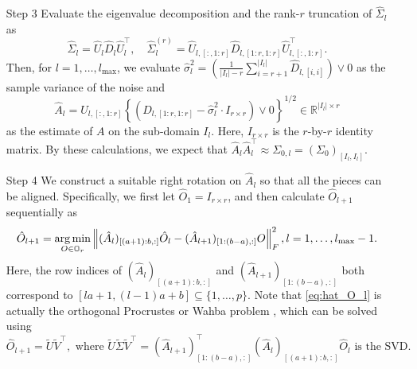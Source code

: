 \documentclass[11pt]{article}
\newcommand{\0}{{\mathbf{0}}}
\newcommand{\1}{{\mathbf{1}}}
\newcommand{\argmin}{\mathop{\rm arg\min}}
\begin{document}
\begin{enumerate}
	\item[Step 3] Evaluate the eigenvalue decomposition and the rank-$r$ truncation of $\hat{\Sigma}_l$ as 
	\begin{equation}
	\hat{\Sigma}_l = \hat{U}_l\hat{D}_l\hat{U}_l^\top,\quad \hat{\Sigma}_l^{(r)} = \hat{U}_{l, [:, 1:r]}\hat{D}_{l, [1:r, 1:r]}\hat{U}_{l, [:, 1:r]}^\top.
	\end{equation}
	Then, for $l=1,\ldots, l_{\max}$, we evaluate $\hat{\sigma}_l^2 = (\frac{1}{|I_l|-r}\sum_{i=r+1}^{|I_l|}\hat{D}_{l, [i, i]})\vee 0$ as the sample variance of the noise and 
	\begin{equation}\label{eq:hat-A_l}
	\hat{A}_l = U_{l, [:, 1:r]} \left\{(D_{l, [1:r, 1:r]} - \hat{\sigma}_l^2\cdot I_{r\times r}) \vee 0 \right\}^{1/2} \in \mathbb{R}^{|I_l| \times r}
	\end{equation}
	as the estimate of $A$ on the sub-domain $I_l$. Here, $I_{r\times r}$ is the $r$-by-$r$ identity matrix. By these calculations, we expect that $\hat{A}_l\hat{A}_l^\top \approx \Sigma_{0, l} = (\Sigma_0)_{[I_l, I_l]}$.
	
	
	\item[Step 4] We construct a suitable right rotation on $\hat{A}_l$ so that all the pieces can be aligned. Specifically, we first let $\hat{O}_1 = I_{r\times r}$, and then calculate $\hat{O}_{l+1}$ sequentially as
	\begin{equation}\label{eq:hat_O_l}
	\hat{O}_{l+1} = \argmin_{O\in \mathbb{O}_{r}} \left\|(\hat{A}_l)_{[(a+1): b, :]}\hat{O}_l - (\hat{A}_{l+1})_{[1:(b-a), :]} O\right\|_F^2, l = 1,\ldots, l_{\max}-1.
	\end{equation}
	Here, the row indices of $(\hat{A}_l)_{[(a+1): b, :]}$ and $(\hat{A}_{l+1})_{[1:(b-a), :]}$ both correspond to $[la+1, (l-1)a+b]\subseteq\{1,\ldots, p\}$. Note that \eqref{eq:hat_O_l} is actually the orthogonal Procrustes or Wahba problem \citep{wahba1965least}, which can be solved using
	\begin{equation}
	\hat{O}_{l+1} = \tilde{U}\tilde{V}^\top, \text{ where }  \tilde{U}\tilde{\Sigma}\tilde{V}^\top = (\hat{A}_{l+1})_{[1:(b-a), :]}^\top (\hat{A}_l)_{[(a+1): b, :]}\hat{O}_l \text{  is the SVD}.
	\end{equation}
	

\end{enumerate}
\end{document}
